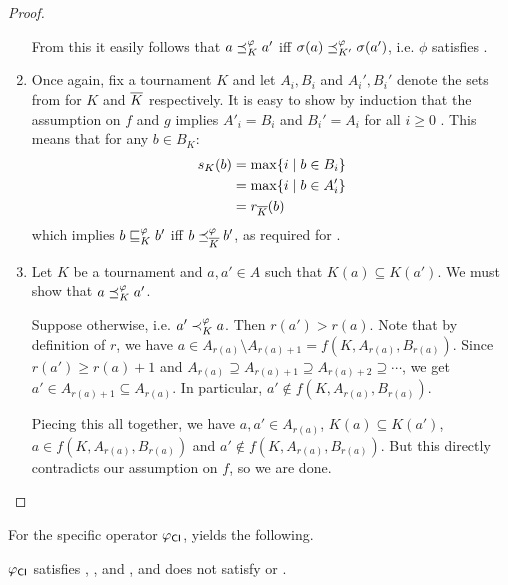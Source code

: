 \begin{proof}
\begin{enumerate}
    From this it easily follows that $a \preceq_K^\varphi a'$ iff $\sigma(a)
    \preceq_{K'}^\varphi \sigma(a')$, i.e.  $\phi$ satisfies .

    \item
    Once again, fix a tournament $K$ and let $A_i, B_i$ and $A_i', B_i'$ denote
    the sets from  for $K$ and ${\overline{K}}$ respectively.
    It is easy to show by induction that the assumption on $f$ and $g$ implies
    $A'_i = B_i$ and $B_i' = A_i$ for all $i \ge 0$ . This means that for any
    $b \in B_K$:
    \begin{align*}
        s_K(b)
        &= \max\{i \mid b \in B_i\} \\
        &= \max\{i \mid b \in A_i'\} \\
        &= r_{{\overline{K}}}(b)
    \end{align*}
    which implies $b \sqsubseteq_K^\varphi b'$ iff $b \preceq_{{\overline{K}}}^\varphi b'$, as
    required for .

    \item
    Let $K$ be a tournament and $a, a' \in A$ such that $K(a) \subseteq K(a')$.
    We must show that $a \preceq_K^\varphi a'$.

    Suppose otherwise, i.e. $a' \prec_K^\varphi a$. Then $r(a') > r(a)$. Note that
    by definition of $r$, we have $a \in A_{r(a)} \setminus A_{r(a) + 1} = f(K,
    A_{r(a)}, B_{r(a)})$. Since $r(a') \ge r(a) + 1$ and $A_{r(a)} \supseteq
    A_{r(a) + 1} \supseteq A_{r(a) + 2} \supseteq \cdots$, we get $a' \in
    A_{r(a) + 1} \subseteq A_{r(a)}$. In particular, $a' \notin f(K, A_{r(a)},
    B_{r(a)})$.

    Piecing this all together, we have $a, a' \in A_{r(a)}$, $K(a) \subseteq
    K(a')$, $a \in f(K, A_{r(a)}, B_{r(a)})$ and $a' \not\in f(K, A_{r(a)},
    B_{r(a)})$. But this directly contradicts our assumption on $f$, so we are
    done.
    \end{enumerate}
\end{proof}

For the specific operator ${\varphi_{\mathsf{CI}}}$,
 yields the following.

\begin{theorem}
    \label{tourn_result_phicardint_axioms}

    ${\varphi_{\mathsf{CI}}}$ satisfies , ,
     and , and does not satisfy  or
    .

\end{theorem}


